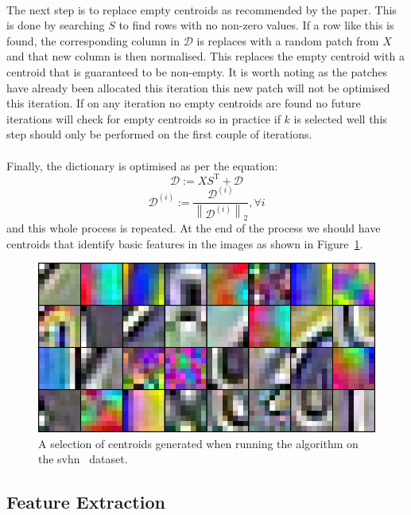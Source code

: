 \documentclass{article}
\begin{document}
\paragraph{}

The next step is to replace empty centroids as recommended by the paper. This is done by searching $S$ to find rows with no non-zero values. If a row like this is found, the corresponding column in $\mathcal{D}$ is replaces with a random patch from $X$ and that new column is then normalised. This replaces the empty centroid with a centroid that is guaranteed to be non-empty. It is worth noting as the patches have already been allocated this iteration this new patch will not be optimised this iteration. If on any iteration no empty centroids are found no future iterations will check for empty centroids so in practice if $k$ is selected well this step should only be performed on the first couple of iterations.

\paragraph{}

Finally, the dictionary is optimised as per the equation:
\[
\mathcal{D} := XS^{\mathrm{T}} + \mathcal{D}
\]\[
\mathcal{D}^{(i)} := \frac{\mathcal{D}^{(i)}}{\left\lVert \mathcal{D}^{(i)} \right\rVert_2}, \forall i
\]
and this whole process is repeated. At the end of the process we should have centroids that identify basic features in the images as shown in Figure~\ref{centroids}.

\begin{figure}[h]
  \includegraphics[width=\linewidth]{centroids.png}
  \caption{A selection of centroids generated when running the algorithm on the svhn~\cite{svhn} dataset.}
  \label{centroids}
\end{figure}

\subsection{Feature Extraction}
\end{document}
